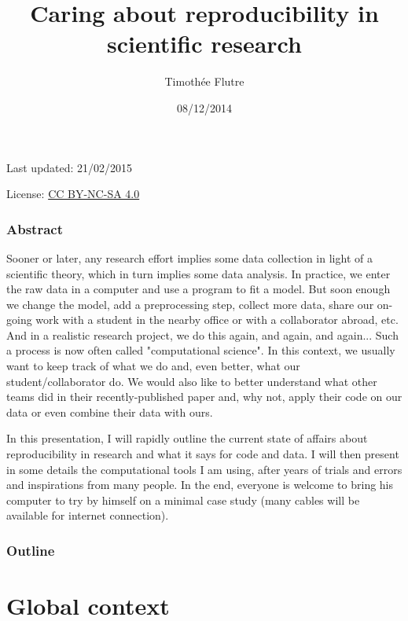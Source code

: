\documentclass[c]{beamer} %
\title[Reproducible research]{Caring about reproducibility in scientific research}
\author[T. Flutre]{Timoth\'{e}e Flutre}
\institute[INRA]{INRA, UMR AGAP}
\date{08/12/2014}
\begin{document}
\begin{frame}
  \titlepage
  
  \tiny
  \begin{center}
    Last updated: 21/02/2015
    
    \medskip
    
    License: \href{http://creativecommons.org/licenses/by-nc-sa/4.0/}{CC BY-NC-SA 4.0}
  \end{center}
\end{frame}                                                                                                                       
\begin{frame}
  \frametitle{Abstract}
  \tiny
  Sooner or later, any research effort implies some data collection in light of a scientific theory, which in turn implies some data analysis. In practice, we enter the raw data in a computer and use a program to fit a model. But soon enough we change the model, add a preprocessing step, collect more data, share our on-going work with a student in the nearby office or with a collaborator abroad, etc. And in a realistic research project, we do this again, and again, and again... Such a process is now often called "computational science". In this context, we usually want to keep track of what we do and, even better, what our student/collaborator do. We would also like to better understand what other teams did in their recently-published paper and, why not, apply their code on our data or even combine their data with ours.
  
  \medskip
  
  In this presentation, I will rapidly outline the current state of affairs about reproducibility in research and what it says for code and data. I will then present in some details the computational tools I am using, after years of trials and errors and inspirations from many people. In the end, everyone is welcome to bring his computer to try by himself on a minimal case study (many cables will be available for internet connection).
  
\end{frame}

\begin{frame}
  \frametitle{Outline}
  \tableofcontents
\end{frame}

\section{Global context}
\end{document}
